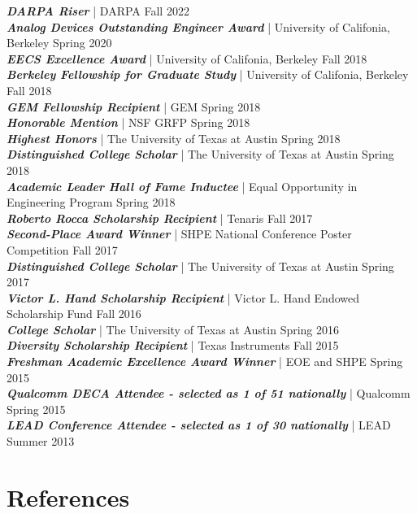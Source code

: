 \documentclass[line]{res}
\begin{document}
\begin{resume}
{\sl \textbf{DARPA Riser}} | DARPA \hfill Fall 2022
\\
{\sl \textbf{Analog Devices Outstanding Engineer Award}} | University of Califonia, Berkeley \hfill Spring 2020
\\
{\sl \textbf{EECS Excellence Award}} | University of Califonia, Berkeley \hfill Fall 2018
\\
{\sl \textbf{Berkeley Fellowship for Graduate Study}} | University of Califonia, Berkeley \hfill Fall 2018
\\
{\sl \textbf{GEM Fellowship Recipient}} | GEM \hfill Spring 2018
\\
{\sl \textbf{Honorable Mention}} | NSF GRFP \hfill Spring 2018
\\
{\sl \textbf{Highest Honors}} | The University of Texas at Austin  \hfill Spring 2018
\\
{\sl \textbf{Distinguished College Scholar}} | The University of Texas at Austin  \hfill Spring 2018
\\
{\sl \textbf{Academic Leader Hall of Fame Inductee}} | Equal Opportunity in Engineering Program  \hfill Spring 2018
\\
{\sl \textbf{Roberto Rocca Scholarship Recipient}} | Tenaris \hfill Fall 2017
\\
{\sl \textbf{Second-Place Award Winner}} | SHPE National Conference Poster Competition  \hfill Fall 2017
\\
{\sl \textbf{Distinguished College Scholar}} | The University of Texas at Austin  \hfill Spring 2017
\\
{\sl \textbf{Victor L. Hand Scholarship Recipient}} | Victor L. Hand Endowed Scholarship Fund \hfill Fall 2016
\\
{\sl \textbf{College Scholar}} | The University of Texas at Austin \hfill Spring 2016
\\
{\sl \textbf{Diversity Scholarship Recipient}} | Texas Instruments \hfill Fall 2015
\\
{\sl \textbf{Freshman Academic Excellence Award Winner}} | EOE and SHPE \hfill Spring 2015
\\
{\sl \textbf{Qualcomm DECA Attendee - selected as 1 of 51 nationally}} | Qualcomm \hfill Spring 2015
\\
{\sl \textbf{LEAD Conference Attendee - selected as 1 of 30 nationally}} | LEAD \hfill Summer 2013

\section{\Large{References}}
\label{sec:refs}
\vspace{2mm}


\end{resume}
\end{document}
